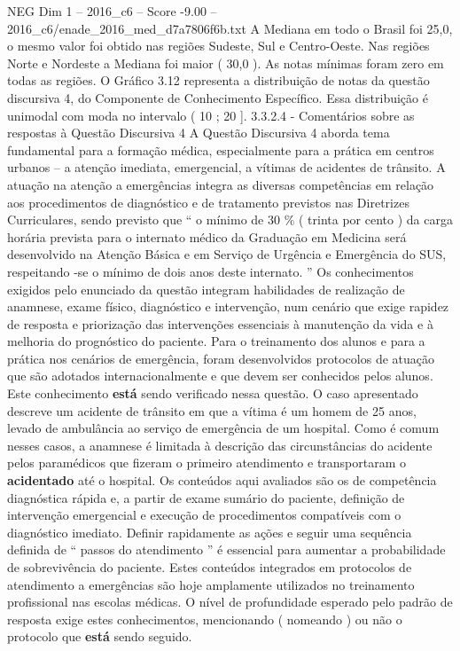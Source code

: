 \begin{textsample}{NEG Dim 1 – 2016\_c6 – Score -9.00 – 2016\_c6/enade\_2016\_med\_d7a7806f6b.txt}
A Mediana em todo o Brasil foi 25,0, o mesmo valor foi obtido nas regiões Sudeste, Sul e Centro-Oeste.
Nas regiões Norte e Nordeste a Mediana foi maior ( 30,0 ).
As notas mínimas foram zero em todas as regiões.
O Gráfico 3.12 representa a distribuição de notas da questão discursiva 4, do Componente de Conhecimento Específico.
Essa distribuição é unimodal com moda no intervalo ( 10 ; 20 ]. 3.3.2.4 - Comentários sobre as respostas à Questão Discursiva 4 A Questão Discursiva 4 aborda tema fundamental para a formação médica, especialmente para a prática em centros urbanos – a atenção imediata, emergencial, a vítimas de acidentes de trânsito.
A atuação na atenção a emergências integra as diversas competências em relação aos procedimentos de diagnóstico e de tratamento previstos nas Diretrizes Curriculares, sendo previsto que “ o mínimo de 30 \% ( trinta por cento ) da carga horária prevista para o internato médico da Graduação em Medicina será desenvolvido na Atenção Básica e em Serviço de Urgência e Emergência do SUS, respeitando -se o mínimo de dois anos deste internato. ” Os conhecimentos exigidos pelo enunciado da questão integram habilidades de realização de anamnese, exame físico, diagnóstico e intervenção, num cenário que exige rapidez de resposta e priorização das intervenções essenciais à manutenção da vida e à melhoria do prognóstico do paciente.
Para o treinamento dos alunos e para a prática nos cenários de emergência, foram desenvolvidos protocolos de atuação que são adotados internacionalmente e que devem ser conhecidos pelos alunos.
Este conhecimento \textbf{está} sendo verificado nessa questão.
O caso apresentado descreve um acidente de trânsito em que a vítima é um homem de 25 anos, levado de ambulância ao serviço de emergência de um hospital.
Como é comum nesses casos, a anamnese é limitada à descrição das circunstâncias do acidente pelos paramédicos que fizeram o primeiro atendimento e transportaram o \textbf{acidentado} até o hospital.
Os conteúdos aqui avaliados são os de competência diagnóstica rápida e, a partir de exame sumário do paciente, definição de intervenção emergencial e execução de procedimentos compatíveis com o diagnóstico imediato.
Definir rapidamente as ações e seguir uma sequência definida de “ passos do atendimento ” é essencial para aumentar a probabilidade de sobrevivência do paciente.
Estes conteúdos integrados em protocolos de atendimento a emergências são hoje amplamente utilizados no treinamento profissional nas escolas médicas.
O nível de profundidade esperado pelo padrão de resposta exige estes conhecimentos, mencionando ( nomeando ) ou não o protocolo que \textbf{está} sendo seguido.

\end{textsample}
